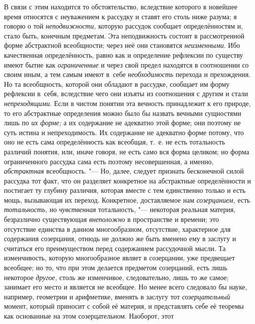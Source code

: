 В связи с этим находится то обстоятельство, вследствие которого в новейшее
время относятся с неуважением к рассудку и ставят его столь ниже
разума; я говорю о той {\em неподвижности,} которую
рассудок сообщает определённостям и, стало быть, конечным предметам. Эта
неподвижность состоит в рассмотренной форме абстрактной всеобщности; через неё
они становятся {\em неизменными}. Ибо качественная определённость, равно как и
определение рефлексии по существу имеют бытие как {\em ограниченные} и через
свой предел находятся в соотношении со своим иным, а тем самым имеют в~себе
{\em необходимость} перехода и прехождения. Но та всеобщность, которой они
обладают в рассудке, сообщает им форму рефлексии в~себя, вследствие чего они
изъяты из соотношения с другим и стали {\em непреходящими}. Если в чистом
понятии эта вечность принадлежит к его природе, то его абстрактные определения
можно было бы назвать вечными сущностями лишь по {\em их форме;} а их
содержание не адекватно этой форме; они поэтому не суть истина и
непреходимость. Их содержание не адекватно форме потому, что оно не есть сама
определённость как всеобщая, т.~е. не есть тотальность различий понятия, или,
иначе говоря, не есть само вся форма целиком; но форма ограниченного рассудка
сама есть поэтому несовершенная, а именно, {\em абстрактная}
всеобщность. "--- Но, далее, следует признать
бесконечной силой рассудка тот факт, что он разделяет конкретное на
абстрактные определённости и постигает ту глубину различия, которая вместе
с тем единственно только и есть мощь, вызывающая их переход. Конкретное,
доставляемое нам {\em созерцанием,} есть {\em тотальность,} но
{\em чувственная} тотальность, "--- некоторая реальная материя,
безразлично существующая {\em внеположно} в
пространстве и времени; это отсутствие единства в данном многообразном,
отсутствие, характерное для содержания созерцания, отнюдь не должно же быть
вменено ему в заслугу и считаться его преимуществом перед содержанием
рассудочной мысли. Та изменчивость, которую многообразное являет в
созерцании, уже предвещает всеобщее; но то, что при этом делается предметом
созерцаний, есть лишь некоторое
{\em другое,} столь же
изменчивое, следовательно, лишь то же самое; занимает его место и является
не всеобщее. Но менее всего следовало бы науке, например, геометрии и
арифметике, вменять в заслугу тот
{\em созерцательный}
момент, который приносит с собой её материя, и представлять
себе её теоремы как основанные на этом созерцательном. Наоборот, этот
